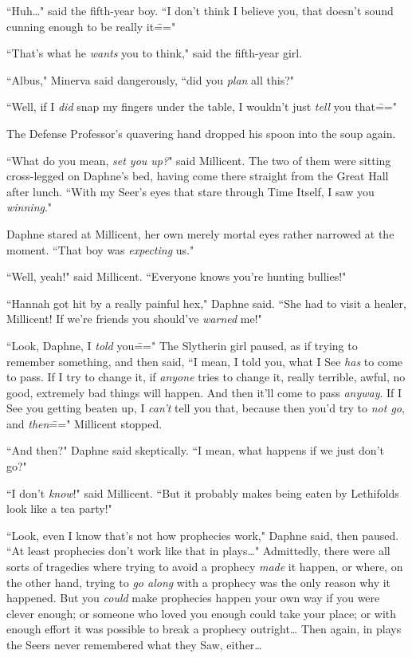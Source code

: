 ``Huh{\ldots}" said the fifth-year boy. ``I don't think I believe you, that doesn't sound cunning enough to be really it\==="

``That's what he \emph{wants} you to think," said the fifth-year girl.

\later

``Albus," Minerva said dangerously, ``did you \emph{plan} all this?"

\later

``Well, if I \emph{did} snap my fingers under the table, I wouldn't just \emph{tell} you that\==="

\later

The Defense Professor's quavering hand dropped his spoon into the soup again.

\later

``What do you mean, \emph{set you up?}" said Millicent. The two of them were sitting cross-legged on Daphne's bed, having come there straight from the Great Hall after lunch. ``With my Seer's eyes that stare through Time Itself, I saw you \emph{winning}."

Daphne stared at Millicent, her own merely mortal eyes rather narrowed at the moment. ``That boy was \emph{expecting} us."

``Well, yeah!" said Millicent. ``Everyone knows you're hunting bullies!"

``Hannah got hit by a really painful hex," Daphne said. ``She had to visit a healer, Millicent! If we're friends you should've \emph{warned} me!"

``Look, Daphne, I \emph{told} you\===" The Slytherin girl paused, as if trying to remember something, and then said, ``I mean, I told you, what I See \emph{has} to come to pass. If I try to change it, if \emph{anyone} tries to change it, really terrible, awful, no good, extremely bad things will happen. And then it'll come to pass \emph{anyway}. If I See you getting beaten up, I \emph{can't} tell you that, because then you'd try to \emph{not go}, and \emph{then}\===" Millicent stopped.

``And then?" Daphne said skeptically. ``I mean, what happens if we just don't go?"

``I don't \emph{know}!" said Millicent. ``But it probably makes being eaten by Lethifolds look like a tea party!"

``Look, even I know that's not how prophecies work," Daphne said, then paused. ``At least prophecies don't work like that in plays{\ldots}" Admittedly, there were all sorts of tragedies where trying to avoid a prophecy \emph{made} it happen, or where, on the other hand, trying to \emph{go along} with a prophecy was the only reason why it happened. But you \emph{could} make prophecies happen your own way if you were clever enough; or someone who loved you enough could take your place; or with enough effort it was possible to break a prophecy outright{\ldots} Then again, in plays the Seers never remembered what they Saw, either{\ldots}

